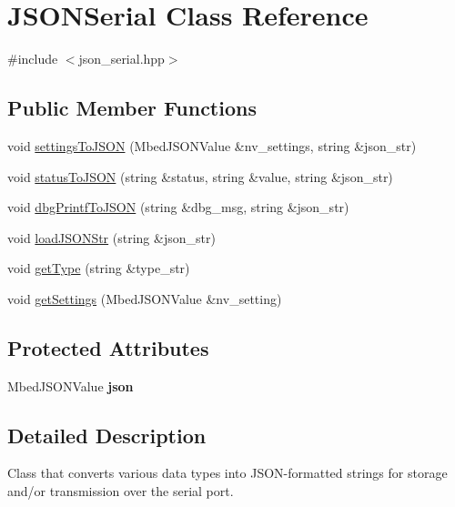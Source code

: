 \hypertarget{classJSONSerial}{}\section{J\+S\+O\+N\+Serial Class Reference}
\label{classJSONSerial}


{\ttfamily \#include $<$json\+\_\+serial.\+hpp$>$}

\subsection*{Public Member Functions}
\begin{DoxyCompactItemize}
\item 
void \hyperlink{classJSONSerial_a32f2b8eddfbe137c61b77352445e1e09}{settings\+To\+J\+S\+ON} (Mbed\+J\+S\+O\+N\+Value \&nv\+\_\+settings, string \&json\+\_\+str)
\item 
void \hyperlink{classJSONSerial_ae1fb99c885d204203a48ef45c16252a2}{status\+To\+J\+S\+ON} (string \&status, string \&value, string \&json\+\_\+str)
\item 
void \hyperlink{classJSONSerial_a6070c03a5caca84d5bd4237db0bd28c4}{dbg\+Printf\+To\+J\+S\+ON} (string \&dbg\+\_\+msg, string \&json\+\_\+str)
\item 
void \hyperlink{classJSONSerial_a21379660c361f4d26f0fd42a4734662e}{load\+J\+S\+O\+N\+Str} (string \&json\+\_\+str)
\item 
void \hyperlink{classJSONSerial_ace1745d4308eef3f8734186cf55496e2}{get\+Type} (string \&type\+\_\+str)
\item 
void \hyperlink{classJSONSerial_a7f12c4a3d58ff26825fbaf8694b7a795}{get\+Settings} (Mbed\+J\+S\+O\+N\+Value \&nv\+\_\+setting)
\end{DoxyCompactItemize}
\subsection*{Protected Attributes}
\begin{DoxyCompactItemize}
\item 
\mbox{\label{classJSONSerial_a2331c7c7da1ee32488b9c73821703c8d}} 
Mbed\+J\+S\+O\+N\+Value {\bfseries json}
\end{DoxyCompactItemize}


\subsection{Detailed Description}
Class that converts various data types into J\+S\+O\+N-\/formatted strings for storage and/or transmission over the serial port. 

